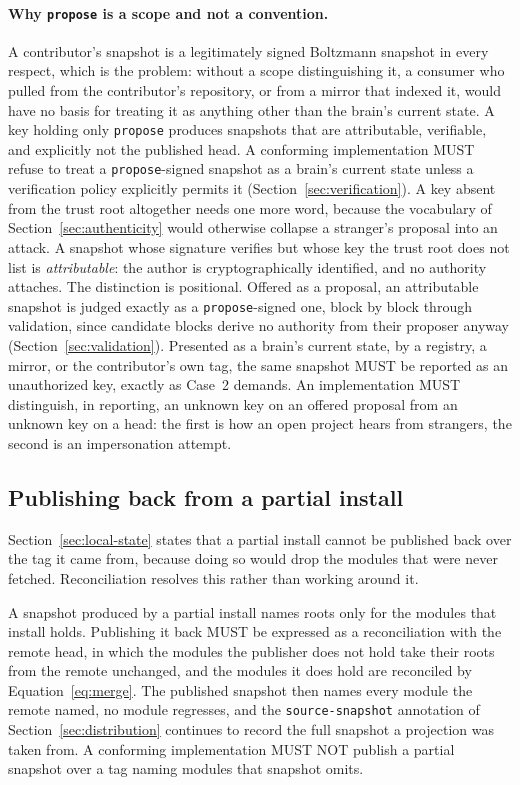 \documentclass[11pt,a4paper]{article}
\begin{document}
\paragraph{Why \texttt{propose} is a scope and not a convention.}
A contributor's snapshot is a legitimately signed Boltzmann snapshot in every
respect, which is the problem: without a scope distinguishing it, a consumer who
pulled from the contributor's repository, or from a mirror that indexed it, would
have no basis for treating it as anything other than the brain's current state. A key holding only \texttt{propose} produces snapshots that are attributable,
verifiable, and explicitly not the published head. A conforming implementation
MUST refuse to treat a \texttt{propose}-signed snapshot as a brain's current
state unless a verification policy explicitly permits it
(Section~\ref{sec:verification}). A key absent from the trust root altogether
needs one more word, because the vocabulary of Section~\ref{sec:authenticity}
would otherwise collapse a stranger's proposal into an attack. A snapshot
whose signature verifies but whose key the trust root does not list is
\emph{attributable}: the author is cryptographically identified, and no
authority attaches. The distinction is positional. Offered as a proposal, an
attributable snapshot is judged exactly as a \texttt{propose}-signed one,
block by block through validation, since candidate blocks derive no authority
from their proposer anyway (Section~\ref{sec:validation}). Presented as a
brain's current state, by a registry, a mirror, or the contributor's own tag,
the same snapshot MUST be reported as an unauthorized key, exactly as Case~2
demands. An implementation MUST distinguish, in reporting, an unknown key on
an offered proposal from an unknown key on a head: the first is how an open
project hears from strangers, the second is an impersonation attempt.

\subsection{Publishing back from a partial install}
\label{sec:partial-publish}

Section~\ref{sec:local-state} states that a partial install cannot be published
back over the tag it came from, because doing so would drop the modules that were
never fetched. Reconciliation resolves this rather than working around it.

A snapshot produced by a partial install names roots only for the modules that
install holds. Publishing it back MUST be expressed as a reconciliation with the
remote head, in which the modules the publisher does not hold take their roots
from the remote unchanged, and the modules it does hold are reconciled by
Equation~\ref{eq:merge}. The published snapshot then names every module the
remote named, no module regresses, and the \texttt{source-snapshot} annotation of
Section~\ref{sec:distribution} continues to record the full snapshot a projection
was taken from. A conforming implementation MUST NOT publish a partial snapshot
over a tag naming modules that snapshot omits.
\end{document}
